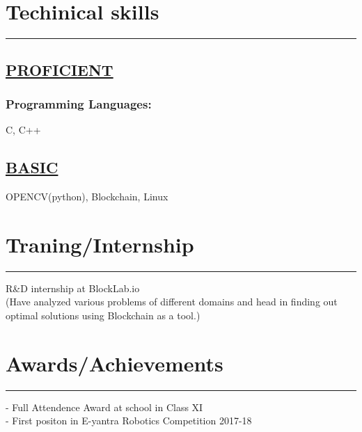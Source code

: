 \documentclass{article}
\begin{document}
\section{Techinical skills}
\vspace{-1.3em}
\hrule height 0.7pt
\vspace {1em}

\subsection{\bfseries \hspace{3em}  \underline {PROFICIENT}}
\subsubsection{\hspace{6em}\large Programming Languages:}
\vspace {-1.8em}
\hspace{19em}
 {C, C++}
\vspace{-0.2em}
\subsection{\hspace{3em} \bfseries \underline{BASIC} }

\vspace {-0.5em}
\hspace{5.5em}
{OPENCV(python), Blockchain, Linux}

\section{Traning/Internship}
\vspace{-1.2em}
\hrule height 0.7pt
\vspace {1em}
\hspace{5.5em}
\begin{adjustwidth}{3.5em}{0pt}
	R\&D internship at BlockLab.io\\
	(Have analyzed various problems of different domains and head in finding out optimal solutions using Blockchain as a tool.)\\
	
\end{adjustwidth}

\section{Awards/Achievements}
\vspace{-1.2em}
\hrule height 0.7pt
\vspace {1em}
\hspace{3em}
\begin{adjustwidth}{3.5em}{0pt}
	- Full Attendence Award at school in Class XI\\
	- First positon in E-yantra Robotics Competition 2017-18\\
	
\end{adjustwidth} 
\end{document}
